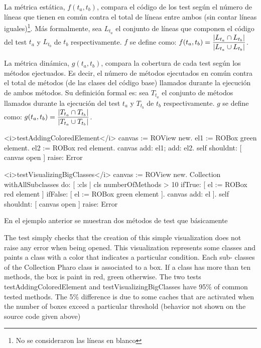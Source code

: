 \par La métrica estática, $f(t_a,t_b)$, compara el código de los test según el número de líneas que tienen en común contra el total de líneas entre ambos (sin contar líneas iguales)\footnote{No se consideraron las líneas en blanco}. Más formalmente, sea $L_{t_a}$ el conjunto de líneas que componen el código del test $t_a$ y  $L_{t_b}$ de $t_b$ respectivamente. $f$ se define como: $f(t_a,t_b)= \dfrac{\vert L_{t_a} \cap L_{t_b} \vert}{\vert L_{t_a} \cup L_{t_b} \vert}$.

\par La métrica dinámica, $g(t_a,t_b)$, compara la cobertura de cada test según los métodos ejectuados. Es decir, el número de métodos ejecutados en común contra el total de métodos (de las clases del código base) llamados durante la ejecución de ambos métodos. Su definición formal es: sea $T_{t_a}$ el conjunto de métodos llamados durante la ejecución del test $t_a$ y  $T_{t_b}$ de $t_b$ respectivamente. $g$ se define como: $g(t_a,t_b)= \dfrac{\vert T_{t_a} \cap T_{t_b} \vert}{\vert T_{t_a} \cup T_{t_b} \vert}$.



\begin{codeWithLineNumbers}
<i>testAddingColoredElement</i>
	canvas := ROView new.
	el1 := ROBox green element.
	el2 := ROBox red element.
	canvas add: el1; add: el2.
	self shouldnt: [ canvas open ] raise: Error

<i>testVisualizingBigClasses</i>
	canvas := ROView new.
	Collection withAllSubclasses do: [ :cls |
		cls numberOfMethods > 10
			ifTrue: [ el := ROBox red element ]
			ifFalse: [ el := ROBox green element ].
		canvas add: el ].
	self shouldnt: [ canvas open ] raise: Error
\end{codeWithLineNumbers} 

\par En el ejemplo anterior se muestran dos métodos de test que básicamente


The test simply checks that the creation of this simple visualization does not raise any error when being opened.
This visualization represents some classes and paints a class with a color that indicates a particular condition. Each sub- classes of the Collection Pharo class is associated to a box. If a class has more than ten methods, the box is paint in red, green otherwise. The two tests testAddingColoredElement and testVisualizingBigClasses have 95\% of common tested methods. The 5\% difference is due to some caches that are activated when the number of boxes exceed a particular threshold (behavior not shown on the source code given above)